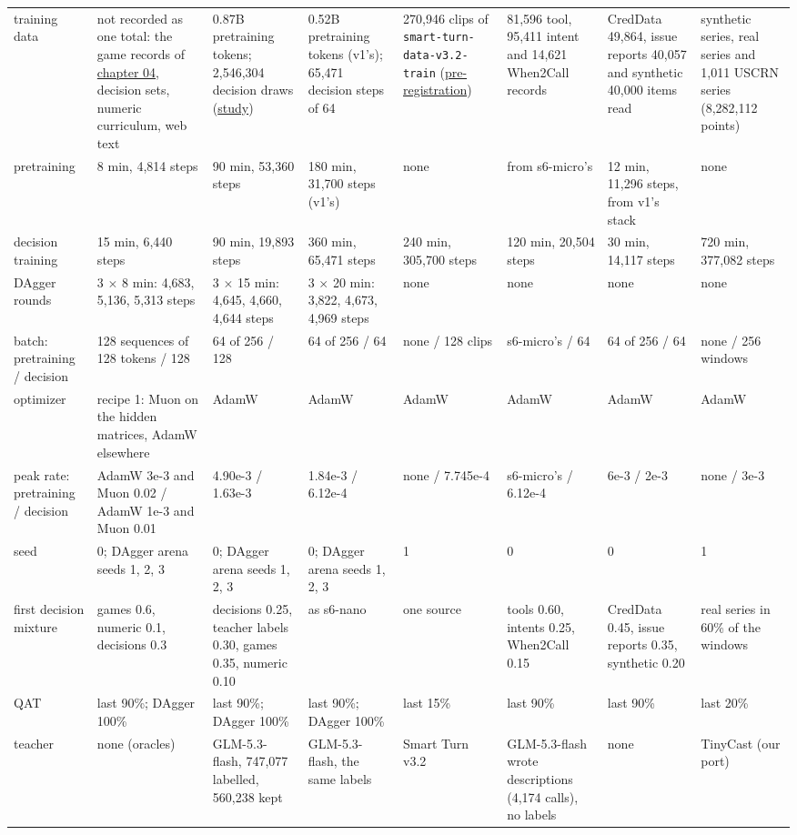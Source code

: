 \documentclass[10pt]{article}
\begin{document}
\begin{table}[p]
\begin{tabularx}{\linewidth}{@{}P{1.55cm}LLLLLLL@{}}
training data & not recorded as one total: the game records of \href{https://maxgfr.github.io/skycmd/tutorial/04-game-cores-and-oracles}{chapter 04}, decision sets, numeric curriculum, web text & 0.87B pretraining tokens; 2,546,304 decision draws (\href{https://github.com/maxgfr/skycmd/blob/main/docs/s6-nano2-study.md}{study}) & 0.52B pretraining tokens (v1's); 65,471 decision steps of 64 & 270,946 clips of \texttt{smart-\allowbreak{}turn-\allowbreak{}data-\allowbreak{}v3.2-\allowbreak{}train} (\href{https://github.com/maxgfr/skycmd/blob/main/docs/s6-ear2-prereg.md}{pre-registration}) & 81,596 tool, 95,411 intent and 14,621 When2Call~\cite{when2call} records & CredData 49,864, issue reports 40,057 and synthetic 40,000 items read & synthetic series, real series and 1,011 USCRN series (8,282,112 points) \\
pretraining & 8 min, 4,814 steps & 90 min, 53,360 steps & 180 min, 31,700 steps (v1's) & none & from s6-micro's & 12 min, 11,296 steps, from v1's stack & none \\
decision training & 15 min, 6,440 steps & 90 min, 19,893 steps & 360 min, 65,471 steps & 240 min, 305,700 steps & 120 min, 20,504 steps & 30 min, 14,117 steps & 720 min, 377,082 steps \\
DAgger rounds & 3 $\times$ 8 min: 4,683, 5,136, 5,313 steps & 3 $\times$ 15 min: 4,645, 4,660, 4,644 steps & 3 $\times$ 20 min: 3,822, 4,673, 4,969 steps & none & none & none & none \\
batch: pretraining / decision & 128 sequences of 128 tokens / 128 & 64 of 256 / 128 & 64 of 256 / 64 & none / 128 clips & s6-micro's / 64 & 64 of 256 / 64 & none / 256 windows \\
optimizer & recipe 1: Muon on the hidden matrices, AdamW elsewhere & AdamW & AdamW & AdamW & AdamW & AdamW & AdamW \\
peak rate: pretraining / decision & AdamW 3e-3 and Muon 0.02 / AdamW 1e-3 and Muon 0.01 & 4.90e-3 / 1.63e-3 & 1.84e-3 / 6.12e-4 & none / 7.745e-4 & s6-micro's / 6.12e-4 & 6e-3 / 2e-3 & none / 3e-3 \\
seed & 0; DAgger arena seeds 1, 2, 3 & 0; DAgger arena seeds 1, 2, 3 & 0; DAgger arena seeds 1, 2, 3 & 1 & 0 & 0 & 1 \\
first decision mixture & games 0.6, numeric 0.1, decisions 0.3 & decisions 0.25, teacher labels 0.30, games 0.35, numeric 0.10 & as s6-nano & one source & tools 0.60, intents 0.25, When2Call 0.15 & CredData 0.45, issue reports 0.35, synthetic 0.20 & real series in 60\% of the windows \\
QAT & last 90\%; DAgger 100\% & last 90\%; DAgger 100\% & last 90\%; DAgger 100\% & last 15\% & last 90\% & last 90\% & last 20\% \\
teacher & none (oracles) & GLM-5.3-flash, 747,077 labelled, 560,238 kept & GLM-5.3-flash, the same labels & Smart Turn v3.2 & GLM-5.3-flash wrote descriptions (4,174 calls), no labels & none & TinyCast (our port) \\
\bottomrule
\end{tabularx}
\end{table}
\end{document}

